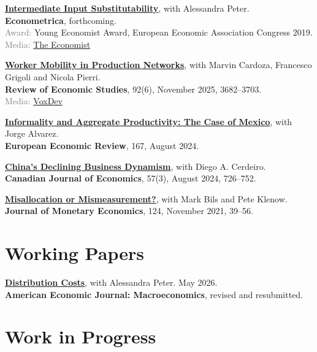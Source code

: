 \documentclass[10pt,a4paper]{article}
\newcommand{\titlelink}[2]{{\hypersetup{urlcolor=black}\href{#1}{#2}}}
\let\oldsection\section
\renewcommand{\section}{\Needspace*{5\baselineskip}\oldsection}
\newcommand{\paper}[3]{\par\noindent\begin{minipage}[t]{\textwidth}\textbf{#2}, #3\end{minipage}\par\vspace{6pt}}
\newcommand{\journal}[1]{\textbf{\textcolor{accent}{#1}}}
\newcommand{\lbl}[1]{\textcolor{grey}{#1}}
\begin{document}
\paper{Forthcoming}{\titlelink{https://www.cianruane.com/papers/IIS_PeterRuane.pdf}{Intermediate Input Substitutability}}{%
with Alessandra Peter.\\ \journal{Econometrica}, forthcoming.\\
\lbl{Award:} Young Economist Award, European Economic Association Congress 2019.\\
\lbl{Media:} \href{https://www.economist.com/finance-and-economics/2022/04/30/how-would-an-energy-embargo-affect-germanys-economy}{The Economist}}

\paper{2025}{\titlelink{https://academic.oup.com/restud/article/92/6/3682/7933531}{Worker Mobility in Production Networks}}{%
with Marvin Cardoza, Francesco Grigoli and Nicola Pierri.\\ \journal{Review of Economic Studies}, 92(6), November 2025, 3682--3703.\\
\lbl{Media:} \href{https://voxdev.org/topic/labour-markets-migration/hiring-suppliers-and-customers-dominican-republic}{VoxDev}}

\paper{2024}{\titlelink{https://www.sciencedirect.com/science/article/abs/pii/S001429212400120X}{Informality and Aggregate Productivity: The Case of Mexico}}{%
with Jorge Alvarez.\\ \journal{European Economic Review}, 167, August 2024.}

\paper{2024}{\titlelink{https://onlinelibrary.wiley.com/doi/abs/10.1111/caje.12726}{China's Declining Business Dynamism}}{%
with Diego A. Cerdeiro.\\ \journal{Canadian Journal of Economics}, 57(3), August 2024, 726--752.}

\paper{2021}{\titlelink{http://www.klenow.com/misallocation-mismeasurement-paper.pdf}{Misallocation or Mismeasurement?}}{%
with Mark Bils and Pete Klenow.\\ \journal{Journal of Monetary Economics}, 124, November 2021, 39--56.}

\section*{Working Papers}

\paper{2026}{\titlelink{https://www.cianruane.com/papers/PeterRuane_DistributionCosts.pdf}{Distribution Costs}}{%
with Alessandra Peter. May 2026.\\ \journal{American Economic Journal: Macroeconomics}, revised and resubmitted.}

\section*{Work in Progress}
\end{document}
